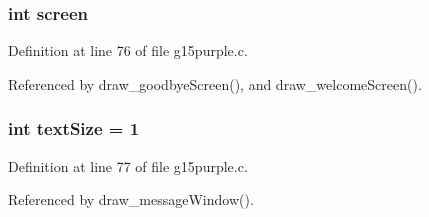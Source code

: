 \subsubsection{\setlength{\rightskip}{0pt plus 5cm}int {\bf screen}}\label{g15purple_8c_3109b0889cec9f0de874a2bdc1f84372}




Definition at line 76 of file g15purple.c.

Referenced by draw\_\-goodbyeScreen(), and draw\_\-welcomeScreen().
\subsubsection{\setlength{\rightskip}{0pt plus 5cm}int {\bf textSize} = 1}\label{g15purple_8c_45780b627cc68e644654ff164efb78d7}




Definition at line 77 of file g15purple.c.

Referenced by draw\_\-messageWindow().